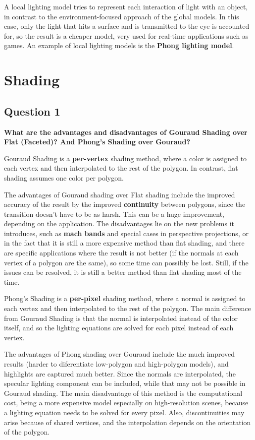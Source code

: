 \documentclass[12pt]{article}
\begin{document}
A local lighting model tries to represent each interaction of light with an object, in contrast to the environment-focused approach of the global models. In this case, only the light that hits a surface and is transmitted to the eye is accounted for, so the result is a cheaper model, very used for real-time applications such as games. An example of local lighting models is the \textbf{Phong lighting model}.

\newpage

\section{Shading}

\subsection*{Question 1}
{\bfseries What are the advantages and disadvantages of Gouraud Shading over Flat (Faceted)? And Phong’s Shading over Gouraud?}

Gouraud Shading is a \textbf{per-vertex} shading method, where a color is assigned to each vertex and then interpolated to the rest of the polygon. In contrast, flat shading assumes one color per polygon. 

The advantages of Gouraud shading over Flat shading include the improved accuracy of the result by the improved \textbf{continuity} between polygons, since the transition doesn't have to be as harsh. This can be a huge improvement, depending on the application. The disadvantages lie on the new problems it introduces, such as \textbf{mach bands} and special cases in perspective projections, or in the fact that it is still a more expensive method than flat shading, and there are specific applications where the result is not better (if the normals at each vertex of a polygon are the same), so some time can possibly be lost. Still, if the issues can be resolved, it is still a better method than flat shading most of the time.

Phong's Shading is a \textbf{per-pixel} shading method, where a normal is assigned to each vertex and then interpolated to the rest of the polygon. The main difference from Gouraud Shading is that the normal is interpolated instead of the color itself, and so the lighting equations are solved for each pixel instead of each vertex.

The advantages of Phong shading over Gouraud include the much improved results (harder to diferentiate low-polygon and high-polygon models), and highlights are captured much better. Since the normals are interpolated, the specular lighting component can be included, while that may not be possible in Gouraud shading. The main disadvantage of this method is the computational cost, being a more expensive model especially on high-resolution scenes, because a lighting equation needs to be solved for every pixel. Also, discontinuities may arise because of shared vertices, and the interpolation depends on the orientation of the polygon.
\end{document}
